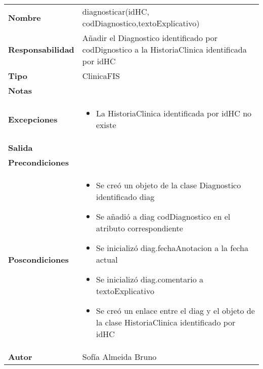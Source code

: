 \documentclass[11pt,a4paper]{article}
\begin{document}
\begin{table}[H]
\centering
\label{my-label}
\begin{tabularx}{\textwidth}{l|X}
\textbf{Nombre}          & diagnosticar(idHC, codDiagnostico,textoExplicativo) \\
\textbf{Responsabilidad} & Añadir el Diagnostico identificado por codDignostico a la HistoriaClinica identificada por idHC\\
\textbf{Tipo}            & ClinicaFIS \\
\textbf{Notas}           &  \\
\textbf{Excepciones}     & 
\begin{itemize}
\item La HistoriaClinica identificada por idHC no existe
\end{itemize}\\
\textbf{Salida}          &  \\
\textbf{Precondiciones}  &  \\
\textbf{Poscondiciones}  &
\begin{itemize}
\item Se creó un objeto de la clase Diagnostico identificado diag
\item Se añadió a diag codDiagnostico en el atributo correspondiente
\item Se inicializó diag.fechaAnotacion a la fecha actual
\item Se inicializó diag.comentario a textoExplicativo
\item Se creó un enlace entre el diag y el objeto de la clase HistoriaClinica identificado por idHC
\end{itemize}\\
\textbf{Autor}           & Sofía Almeida Bruno
\end{tabularx}
\end{table}
\end{document}
